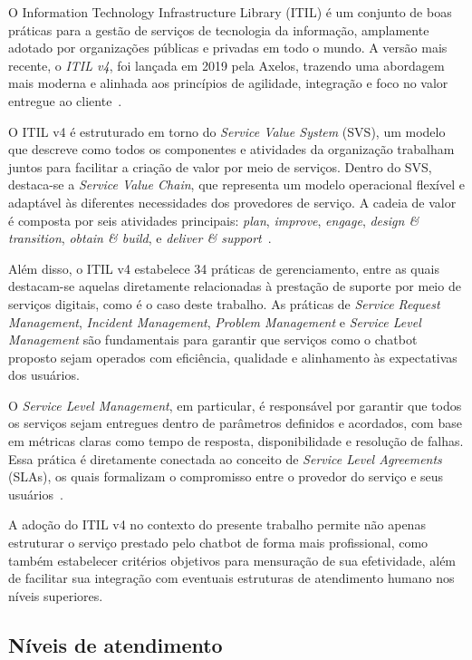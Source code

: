 O Information Technology Infrastructure Library (ITIL) é um conjunto de boas práticas para a gestão de serviços de tecnologia da informação, amplamente adotado por organizações públicas e privadas em todo o mundo. A versão mais recente, o \emph{ITIL v4}, foi lançada em 2019 pela Axelos, trazendo uma abordagem mais moderna e alinhada aos princípios de agilidade, integração e foco no valor entregue ao cliente~\cite{axelos2019itil}.

O ITIL v4 é estruturado em torno do \emph{Service Value System} (SVS), um modelo que descreve como todos os componentes e atividades da organização trabalham juntos para facilitar a criação de valor por meio de serviços. Dentro do SVS, destaca-se a \emph{Service Value Chain}, que representa um modelo operacional flexível e adaptável às diferentes necessidades dos provedores de serviço. A cadeia de valor é composta por seis atividades principais: \textit{plan}, \textit{improve}, \textit{engage}, \textit{design \& transition}, \textit{obtain \& build}, e \textit{deliver \& support}~\cite{axelos2019itil}.

Além disso, o ITIL v4 estabelece 34 práticas de gerenciamento, entre as quais destacam-se aquelas diretamente relacionadas à prestação de suporte por meio de serviços digitais, como é o caso deste trabalho. As práticas de \textit{Service Request Management}, \textit{Incident Management}, \textit{Problem Management} e \textit{Service Level Management} são fundamentais para garantir que serviços como o chatbot proposto sejam operados com eficiência, qualidade e alinhamento às expectativas dos usuários.

O \emph{Service Level Management}, em particular, é responsável por garantir que todos os serviços sejam entregues dentro de parâmetros definidos e acordados, com base em métricas claras como tempo de resposta, disponibilidade e resolução de falhas. Essa prática é diretamente conectada ao conceito de \emph{Service Level Agreements} (SLAs), os quais formalizam o compromisso entre o provedor do serviço e seus usuários~\cite{axelos2019itil}.

A adoção do ITIL v4 no contexto do presente trabalho permite não apenas estruturar o serviço prestado pelo chatbot de forma mais profissional, como também estabelecer critérios objetivos para mensuração de sua efetividade, além de facilitar sua integração com eventuais estruturas de atendimento humano nos níveis superiores.

\subsection{Níveis de atendimento}

